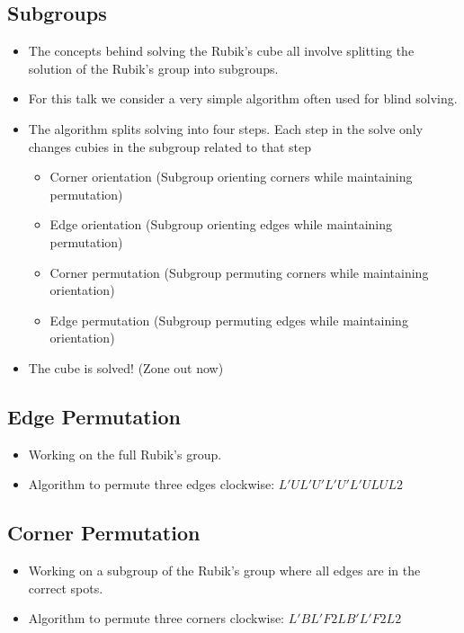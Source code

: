 \documentclass[xcolor=pdftex,dvipsnames,table]{beamer}
\begin{document}
\subsection{Subgroups}
\begin{frame}
  \begin{itemize}
    \item The concepts behind solving the Rubik's cube all involve splitting the solution of the Rubik's group into subgroups.
    \item For this talk we consider a very simple algorithm often used for blind solving.
    \item The algorithm splits solving into four steps. Each step in the solve only changes cubies in the subgroup related to that step
      \begin{itemize}
      \item Corner orientation (Subgroup orienting corners while maintaining permutation)
      \item Edge orientation (Subgroup orienting edges while maintaining permutation)
      \item Corner permutation (Subgroup permuting corners while maintaining orientation)
      \item Edge permutation (Subgroup permuting edges while maintaining orientation)
      \end{itemize}
    \item The cube is solved! (Zone out now)
  \end{itemize}
\end{frame}

\subsection{Edge Permutation}
\begin{frame}
  \begin{itemize}
  \item Working on the full Rubik's group.
  \item Algorithm to permute three edges clockwise: $L' U L' U' L' U' L' U L U L2$
  \end{itemize}
\end{frame}

\subsection{Corner Permutation}
\begin{frame}
  \begin{itemize}
    \item Working on a subgroup of the Rubik's group where all edges are in the correct spots.
    \item Algorithm to permute three corners clockwise: $L' B L' F2 L B' L' F2 L2$
  \end{itemize}
\end{frame}
\end{document}
